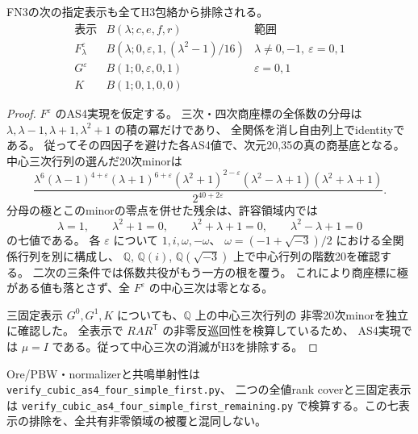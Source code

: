 \begin{proposition}\label{prop:cubic-fn-remaining}
FN3の次の指定表示も全てH3包絡から排除される。
\[
\begin{array}{c|c|c}
 \text{表示}&B(\lambda;c,e,f,r)&\text{範囲}\\\hline
 F^\varepsilon_\lambda&B(\lambda;0,\varepsilon,1,(\lambda^2-1)/16)
   &\lambda\ne0,-1,\ \varepsilon=0,1\\
 G^\varepsilon&B(1;0,\varepsilon,0,1)&\varepsilon=0,1\\
 K&B(1;0,1,0,0)&
\end{array}
\]
\end{proposition}
\begin{proof}
$F^\varepsilon$ のAS4実現を仮定する。
三次・四次商座標の全係数の分母は
$\lambda,\lambda-1,\lambda+1,\lambda^2+1$ の積の冪だけであり、
全関係を消し自由列上でidentityである。
従ってその四因子を避けた各AS4値で、次元20,35の真の商基底となる。
中心三次行列の選んだ20次minorは
\[
 \frac{\lambda^6(\lambda-1)^{4+\varepsilon}(\lambda+1)^{6+\varepsilon}
 (\lambda^2+1)^{2-\varepsilon}(\lambda^2-\lambda+1)(\lambda^2+\lambda+1)}
 {2^{40+2\varepsilon}}.
\]
分母の極とこのminorの零点を併せた残余は、許容領域内では
\[
 \lambda=1,\qquad \lambda^2+1=0,\qquad
 \lambda^2+\lambda+1=0,\qquad\lambda^2-\lambda+1=0
\]
の七値である。
各 $\varepsilon$ について $1,i,\omega,-\omega$、
$\omega=(-1+\sqrt{-3})/2$ における全関係行列を別に構成し、
$\mathbb Q$, $\mathbb Q(i)$, $\mathbb Q(\sqrt{-3})$ 上で中心行列の階数20を確認する。
二次の三条件では係数共役がもう一方の根を覆う。
これにより商座標に極がある値も落とさず、全 $F^\varepsilon$ の中心三次は零となる。

三固定表示 $G^0,G^1,K$ についても、$\mathbb Q$ 上の中心三次行列の
非零20次minorを独立に確認した。
全表示で $R A R^{\mathsf T}$ の非零反巡回性を検算しているため、
AS4実現では $\mu=I$ である。従って中心三次の消滅がH3を排除する。
\end{proof}

Ore/PBW・normalizerと共鳴単射性は
\texttt{verify\_\allowbreak{}cubic\_\allowbreak{}as4\_\allowbreak{}four\_\allowbreak{}simple\_\allowbreak{}first.py}、
二つの全値rank coverと三固定表示は
\texttt{verify\_\allowbreak{}cubic\_\allowbreak{}as4\_\allowbreak{}four\_\allowbreak{}simple\_\allowbreak{}first\_\allowbreak{}remaining.py}
で検算する。この七表示の排除を、全共有非零領域の被覆と混同しない。

